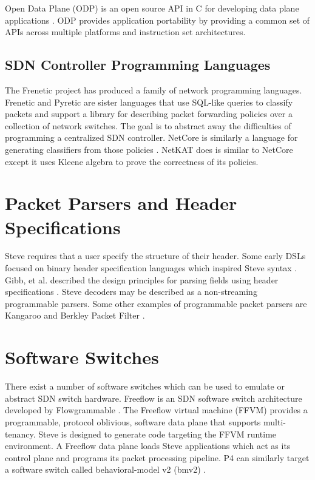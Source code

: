 Open Data Plane (ODP) is an open source API in C for developing data plane applications \cite{odp_webpage}. ODP provides application portability by providing a common set of APIs across multiple platforms and instruction set architectures.

\subsection{SDN Controller Programming Languages} \label{rel:frenetic}

The Frenetic project has produced a family of network programming
languages. Frenetic \cite{foster2011frenetic, foster2013frenetic} and Pyretic \cite{modularpyretic} are sister languages
that use SQL-like queries to classify packets and support a library for describing
packet forwarding policies over a collection of network switches. The goal is to
abstract away the difficulties of programming a centralized SDN controller.
NetCore is similarly a language for
generating classifiers from those policies \cite{monsanto2012netcore}. 
NetKAT does is similar to NetCore except it uses Kleene algebra \cite{kozen2014netkat, anderson2014netkat} to prove the correctness of its policies.

\section{Packet Parsers and Header Specifications}

Steve requires that a user specify the structure of their header.
Some early DSLs focused on binary header specification languages which inspired Steve syntax \cite{binpac, packet_types, datascript}.
Gibb, et al. described the design principles for parsing fields using header specifications
\cite{parser2013gibb}. Steve decoders may be described as a non-streaming programmable parsers. 
Some other examples of programmable packet parsers are Kangaroo \cite{kangaroo} and Berkley Packet Filter \cite{bpf1993mccanne}.

\section{Software Switches}
\label{rel:freeflow}

There exist a number of software switches which can be used to emulate or abstract SDN switch hardware.
Freeflow is an SDN software switch architecture developed
by Flowgrammable \cite{freeflow_software}. The Freeflow virtual machine (FFVM) 
provides a programmable, protocol oblivious, software data plane that 
supports multi-tenancy. Steve is
designed to generate code targeting the FFVM runtime environment. A Freeflow data 
plane loads Steve applications which act as its control plane and programs its packet processing pipeline.
P4 can similarly target a software switch called behavioral-model v2 (bmv2) \cite{bmv2_software}. 

